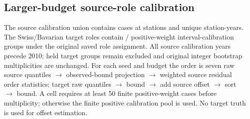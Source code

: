 \begin{table}[t]\centering\small

\caption{Estimated slope RMSE sensitivity to weighting and selection opportunity. Archive, station and group columns weight each respective unit equally within the 805-archive cohort; the last column uses only the 468 nontrivial-choice archives and equal archive weights. These are exploratory summaries, not equivalence tests.}

\label{tab:time-experiment-sensitivity}


\end{table}

\subsection{Larger-budget source-role calibration}

The source calibration union contains \PECalSourceCases{} cases at \PECalSourceStations{} stations and \PECalSourceYears{} unique station-years. The Swiss/Bavarian target roles contain \PECalSwissSourceGroups{}/\PECalBavariaSourceGroups{} positive-weight interval-calibration groups under the original saved role assignment. All source calibration years precede 2010; held target groups remain excluded and original integer bootstrap multiplicities are unchanged. For each seed and budget the order is seven raw source quantiles $\to$ observed-bound projection $\to$ weighted source residual order statistics; target raw quantiles $\to$ bound $\to$ add source offset $\to$ sort $\to$ bound. A cell requires at least 50 finite positive-weight cases before multiplicity; otherwise the finite positive calibration pool is used. No target truth is used for offset estimation.

